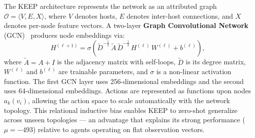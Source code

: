 %


The KEEP architecture represents the network as an attributed graph
$\mathcal{O}=\langle V, E, X \rangle$, where $V$ denotes hosts,
$E$ denotes inter-host connections, and $X$ denotes per-node feature
vectors. A two-layer \textbf{Graph Convolutional Network}
(GCN)~\cite{arXiv:2509.16151} produces node embeddings via:
\begin{equation}
\label{eq:gcn}
  H^{(\ell+1)} = \sigma\!\left(
    \tilde{D}^{-\frac{1}{2}}\,\tilde{A}\,\tilde{D}^{-\frac{1}{2}}\,
    H^{(\ell)}\,W^{(\ell)} + b^{(\ell)}
  \right),
\end{equation}
where $\tilde{A}=A+I$ is the adjacency matrix with self-loops,
$\tilde{D}$ is its degree matrix,
$W^{(\ell)}$ and $b^{(\ell)}$ are trainable parameters,
and $\sigma$ is a non-linear activation function.
The first GCN layer uses 256-dimensional embeddings and the second
uses 64-dimensional embeddings.
Actions are represented as functions upon nodes $a_k(v_i)$,
allowing the action space to scale automatically with the network
topology. This relational inductive bias enables KEEP to
zero-shot generalize across unseen topologies --- an advantage
that explains its strong performance ($\mu=-493$) relative to
agents operating on flat observation vectors.


%

